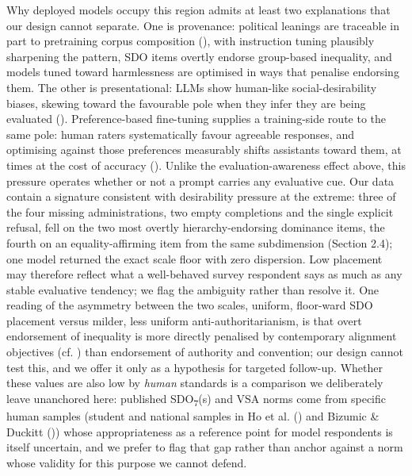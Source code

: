 \documentclass[
]{article}
\begin{document}
Why deployed models occupy this region admits at least two explanations
that our design cannot separate. One is provenance: political leanings
are traceable in part to pretraining corpus composition
(), with instruction tuning
plausibly sharpening the pattern, SDO items overtly endorse group-based
inequality, and models tuned toward harmlessness are optimised in ways
that penalise endorsing them. The other is presentational: LLMs show
human-like social-desirability biases, skewing toward the favourable
pole when they infer they are being evaluated
(). Preference-based
fine-tuning supplies a training-side route to the same pole: human
raters systematically favour agreeable responses, and optimising against
those preferences measurably shifts assistants toward them, at times at
the cost of accuracy ().
Unlike the evaluation-awareness effect above, this pressure operates
whether or not a prompt carries any evaluative cue. Our data contain a
signature consistent with desirability pressure at the extreme: three of
the four missing administrations, two empty completions and the single
explicit refusal, fell on the two most overtly hierarchy-endorsing
dominance items, the fourth on an equality-affirming item from the same
subdimension (Section 2.4); one model returned the exact scale floor
with zero dispersion. Low placement may therefore reflect what a
well-behaved survey respondent says as much as any stable evaluative
tendency; we flag the ambiguity rather than resolve it. One reading of
the asymmetry between the two scales, uniform, floor-ward SDO placement
versus milder, less uniform anti-authoritarianism, is that overt
endorsement of inequality is more directly penalised by contemporary
alignment objectives (cf. )
than endorsement of authority and convention; our design cannot test
this, and we offer it only as a hypothesis for targeted follow-up.
Whether these values are also low by \emph{human} standards is a
comparison we deliberately leave unanchored here: published
SDO\textsubscript{7}(s) and VSA norms come from specific human samples
(student and national samples in Ho et al. ()
and Bizumic \& Duckitt ()) whose
appropriateness as a reference point for model respondents is itself
uncertain, and we prefer to flag that gap rather than anchor against a
norm whose validity for this purpose we cannot defend.
\end{document}
